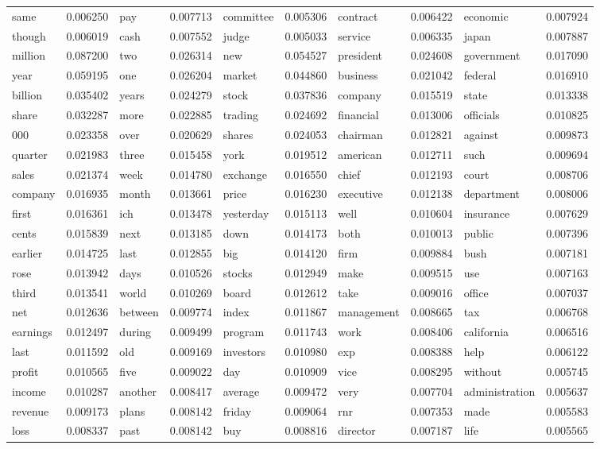\begin{table}[!ht]
\begin{tabular}{llllllllll}
same & 0.006250 & pay & 0.007713 & committee & 0.005306 & contract & 0.006422 & economic & 0.007924\\
though & 0.006019 & cash & 0.007552 & judge & 0.005033 & service & 0.006335 & japan & 0.007887\\
\hline
million & 0.087200 & two & 0.026314 & new & 0.054527 & president & 0.024608 & government & 0.017090\\
year & 0.059195 & one & 0.026204 & market & 0.044860 & business & 0.021042 & federal & 0.016910\\
billion & 0.035402 & years & 0.024279 & stock & 0.037836 & company & 0.015519 & state & 0.013338\\
share & 0.032287 & more & 0.022885 & trading & 0.024692 & financial & 0.013006 & officials & 0.010825\\
000 & 0.023358 & over & 0.020629 & shares & 0.024053 & chairman & 0.012821 & against & 0.009873\\
quarter & 0.021983 & three & 0.015458 & york & 0.019512 & american & 0.012711 & such & 0.009694\\
sales & 0.021374 & week & 0.014780 & exchange & 0.016550 & chief & 0.012193 & court & 0.008706\\
company & 0.016935 & month & 0.013661 & price & 0.016230 & executive & 0.012138 & department & 0.008006\\
first & 0.016361 & ich & 0.013478 & yesterday & 0.015113 & well & 0.010604 & insurance & 0.007629\\
cents & 0.015839 & next & 0.013185 & down & 0.014173 & both & 0.010013 & public & 0.007396\\
earlier & 0.014725 & last & 0.012855 & big & 0.014120 & firm & 0.009884 & bush & 0.007181\\
rose & 0.013942 & days & 0.010526 & stocks & 0.012949 & make & 0.009515 & use & 0.007163\\
third & 0.013541 & world & 0.010269 & board & 0.012612 & take & 0.009016 & office & 0.007037\\
net & 0.012636 & between & 0.009774 & index & 0.011867 & management & 0.008665 & tax & 0.006768\\
earnings & 0.012497 & during & 0.009499 & program & 0.011743 & work & 0.008406 & california & 0.006516\\
last & 0.011592 & old & 0.009169 & investors & 0.010980 & exp & 0.008388 & help & 0.006122\\
profit & 0.010565 & five & 0.009022 & day & 0.010909 & vice & 0.008295 & without & 0.005745\\
income & 0.010287 & another & 0.008417 & average & 0.009472 & very & 0.007704 & administration & 0.005637\\
revenue & 0.009173 & plans & 0.008142 & friday & 0.009064 & rnr & 0.007353 & made & 0.005583\\
loss & 0.008337 & past & 0.008142 & buy & 0.008816 & director & 0.007187 & life & 0.005565\\


\end{tabular}
\end{table}
